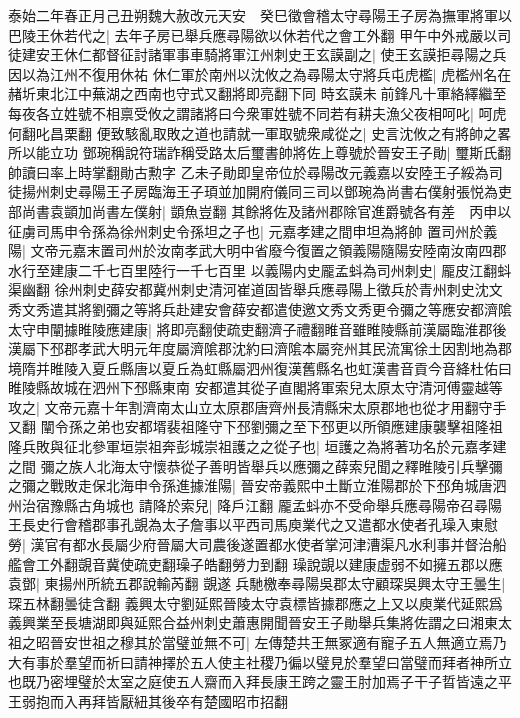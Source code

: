 泰始二年春正月己丑朔魏大赦改元天安　癸巳徵會稽太守尋陽王子房為撫軍將軍以巴陵王休若代之|{
	去年子房已舉兵應尋陽欲以休若代之會工外翻}
甲午中外戒嚴以司徒建安王休仁都督征討諸軍事車騎將軍江州刺史王玄謨副之|{
	使王玄謨拒尋陽之兵因以為江州不復用休祐}
休仁軍於南州以沈攸之為尋陽太守將兵屯虎檻|{
	虎檻州名在赭圻東北江中蕪湖之西南也守式又翻將即亮翻下同}
時玄謨未前鋒凡十軍絡繹繼至每夜各立姓號不相禀受攸之謂諸將曰今衆軍姓號不同若有耕夫漁父夜相呵叱|{
	呵虎何翻叱昌栗翻}
便致駭亂取敗之道也請就一軍取號衆咸從之|{
	史言沈攸之有將帥之畧所以能立功}
鄧琬稱說符瑞詐稱受路太后璽書帥將佐上尊號於晉安王子勛|{
	璽斯氏翻帥讀曰率上時掌翻勛古勲字}
乙未子勛即皇帝位於尋陽改元義嘉以安陸王子綏為司徒揚州刺史尋陽王子房臨海王子頊並加開府儀同三司以鄧琬為尚書右僕射張悦為吏部尚書袁顗加尚書左僕射|{
	顗魚豈翻}
其餘將佐及諸州郡除官進爵號各有差　丙申以征虜司馬申令孫為徐州刺史令孫坦之子也|{
	元嘉孝建之間申坦為將帥}
置司州於義陽|{
	文帝元嘉末置司州於汝南孝武大明中省廢今復置之領義陽隨陽安陸南汝南四郡水行至建康二千七百里陸行一千七百里}
以義陽内史龎孟蚪為司州刺史|{
	龎皮江翻蚪渠幽翻}
徐州刺史薛安都冀州刺史清河崔道固皆舉兵應尋陽上徵兵於青州刺史沈文秀文秀遣其將劉彌之等將兵赴建安會薛安都遣使邀文秀文秀更令彌之等應安都濟隂太守申闡據睢陵應建康|{
	將即亮翻使疏吏翻濟子禮翻睢音雖睢陵縣前漢屬臨淮郡後漢屬下邳郡孝武大明元年度屬濟隂郡沈約曰濟隂本屬兖州其民流寓徐土因割地為郡境隋并睢陵入夏丘縣唐以夏丘為虹縣屬泗州復漢舊縣名也虹漢書音貢今音絳杜佑曰睢陵縣故城在泗州下邳縣東南}
安都遣其從子直閣將軍索兒太原太守清河傅靈越等攻之|{
	文帝元嘉十年割濟南太山立太原郡唐齊州長清縣宋太原郡地也從才用翻守手又翻}
闡令孫之弟也安都壻裴祖隆守下邳劉彌之至下邳更以所領應建康襲擊祖隆祖隆兵敗與征北參軍垣崇祖奔彭城崇祖護之之從子也|{
	垣護之為將著功名於元嘉孝建之間}
彌之族人北海太守懷恭從子善明皆舉兵以應彌之薛索兒聞之釋睢陵引兵擊彌之彌之戰敗走保北海申令孫進據淮陽|{
	晉安帝義熙中土斷立淮陽郡於下邳角城唐泗州治宿豫縣古角城也}
請降於索兒|{
	降戶江翻}
龎孟蚪亦不受命舉兵應尋陽帝召尋陽王長史行會稽郡事孔覬為太子詹事以平西司馬庾業代之又遣都水使者孔璪入東慰勞|{
	漢官有都水長屬少府晉屬大司農後遂置都水使者掌河津漕渠凡水利事并督治船艦會工外翻覬音冀使疏吏翻璪子皓翻勞力到翻}
璪說覬以建康虚弱不如擁五郡以應袁鄧|{
	東揚州所統五郡說輸芮翻}
覬遂兵馳檄奉尋陽吳郡太守顧琛吳興太守王曇生|{
	琛五林翻曇徒含翻}
義興太守劉延熙晉陵太守袁標皆據郡應之上又以庾業代延熙爲義興業至長塘湖即與延熙合益州刺史蕭惠開聞晉安王子勛舉兵集將佐謂之曰湘東太祖之昭晉安世祖之穆其於當璧並無不可|{
	左傳楚共王無冢適有寵子五人無適立焉乃大有事於羣望而祈曰請神擇於五人使主社稷乃徧以璧見於羣望曰當璧而拜者神所立也既乃密埋璧於太室之庭使五人齋而入拜長康王跨之靈王肘加焉子干子晢皆遠之平王弱抱而入再拜皆厭紐其後卒有楚國昭市招翻}
